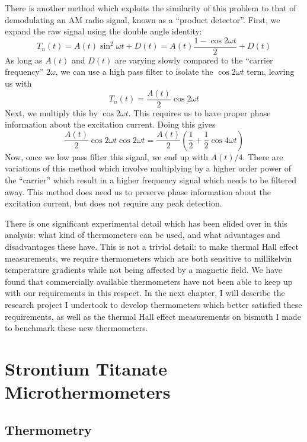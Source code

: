 \documentclass{thesis-umich}
\begin{document}
There is another method which exploits the similarity of this problem to that of demodulating an AM radio signal, known as a ``product detector''. First, we expand the raw signal using the double angle identity:
\[T_n(t) = A(t) \sin^2 \omega t + D(t) = A(t) \frac{1 - \cos 2 \omega t}{2} + D(t)\]
As long as $A(t)$ and $D(t)$ are varying slowly compared to the ``carrier frequency'' $2\omega$, we can use a high pass filter to isolate the $\cos 2\omega t$ term, leaving us with
\[T_n(t) = \frac{A(t)}{2}\cos 2\omega t\]
Next, we multiply this by $\cos 2 \omega t$. This requires us to have proper phase information about the excitation current. Doing this gives
\[ \frac{A(t)}{2} \cos 2 \omega t \cos 2 \omega t = \frac{A(t)}{2}\left(\frac{1}{2} + \frac{1}{2} \cos 4 \omega t \right) \]
Now, once we low pass filter this signal, we end up with $A(t)/4$. There are variations of this method which involve multiplying by a higher order power of the ``carrier'' which result in a higher frequency signal which needs to be filtered away. This method does need us to preserve phase information about the excitation current, but does not require any peak detection.

There is one significant experimental detail which has been elided over in this analysis: what kind of thermometers can be used, and what advantages and disadvantages these have. This is not a trivial detail: to make thermal Hall effect measurements, we require thermometers which are both sensitive to millikelvin temperature gradients while not being affected by a magnetic field. We have found that commercially available thermometers have not been able to keep up with our requirements in this respect. In the next chapter, I will describe the research project I undertook to develop thermometers which better satisfied these requirements, as well as the thermal Hall effect measurements on bismuth I made to benchmark these new thermometers.

\chapter{Strontium Titanate Microthermometers}


\section{Thermometry}
\end{document}
